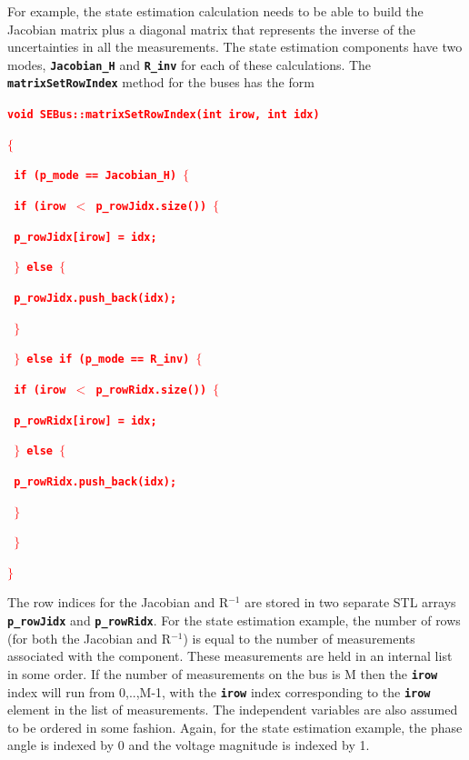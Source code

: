 \documentclass[12pt]{report} %
\begin{document}
For example, the state estimation calculation needs to be able to build the Jacobian matrix plus a diagonal matrix that represents the inverse of the uncertainties in all the measurements. The state estimation components have two modes, \texttt{\textbf{Jacobian\_H}} and \texttt{\textbf{R\_inv}} for each of these calculations. The \texttt{\textbf{matrixSetRowIndex}} method for the buses has the form

\textcolor{red}{\texttt{\textbf{void SEBus::matrixSetRowIndex(int irow, int idx)}}}

\textcolor{red}{\texttt{\textbf{$\boldsymbol{\mathrm{\{}}$}}}

\textcolor{red}{\texttt{\textbf{  if (p\_mode == Jacobian\_H) $\boldsymbol{\mathrm{\{}}$}}}

\textcolor{red}{\texttt{\textbf{    if (irow $\boldsymbol{\mathrm{<}}$ p\_rowJidx.size()) $\boldsymbol{\mathrm{\{}}$}}}

\textcolor{red}{\texttt{\textbf{      p\_rowJidx[irow] = idx;}}}

\textcolor{red}{\texttt{\textbf{    $\boldsymbol{\mathrm{\}}}$ else $\boldsymbol{\mathrm{\{}}$}}}

\textcolor{red}{\texttt{\textbf{      p\_rowJidx.push\_back(idx);}}}

\textcolor{red}{\texttt{\textbf{    $\boldsymbol{\mathrm{\}}}$}}}

\textcolor{red}{\texttt{\textbf{  $\boldsymbol{\mathrm{\}}}$ else if (p\_mode == R\_inv) $\boldsymbol{\mathrm{\{}}$}}}

\textcolor{red}{\texttt{\textbf{    if (irow $\boldsymbol{\mathrm{<}}$ p\_rowRidx.size()) $\boldsymbol{\mathrm{\{}}$}}}

\textcolor{red}{\texttt{\textbf{      p\_rowRidx[irow] = idx;}}}

\textcolor{red}{\texttt{\textbf{    $\boldsymbol{\mathrm{\}}}$ else $\boldsymbol{\mathrm{\{}}$}}}

\textcolor{red}{\texttt{\textbf{      p\_rowRidx.push\_back(idx);}}}

\textcolor{red}{\texttt{\textbf{    $\boldsymbol{\mathrm{\}}}$}}}

\textcolor{red}{\texttt{\textbf{  $\boldsymbol{\mathrm{\}}}$}}}

\textcolor{red}{\texttt{\textbf{$\boldsymbol{\mathrm{\}}}$}}}

The row indices for the Jacobian and R${}^{-1}$ are stored in two separate STL arrays \texttt{\textbf{p\_rowJidx}} and \texttt{\textbf{p\_rowRidx}}. For the state estimation example, the number of rows (for both the Jacobian and R${}^{-1}$) is equal to the number of measurements associated with the component. These measurements are held in an internal list in some order. If the number of measurements on the bus is M then the \texttt{\textbf{irow}} index will run from 0,..,M-1, with the \texttt{\textbf{irow}} index corresponding to the \texttt{\textbf{irow}} element in the list of measurements. The independent variables are also assumed to be ordered in some fashion. Again, for the state estimation example, the phase angle is indexed by 0 and the voltage magnitude is indexed by 1. 
\end{document}
